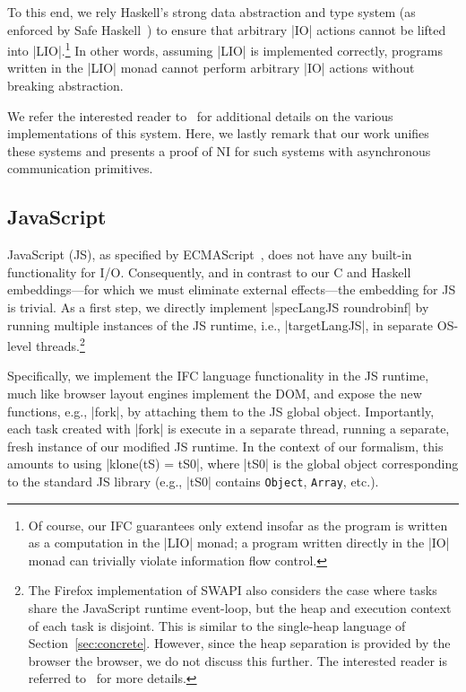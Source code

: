 To this end, we rely Haskell's strong data abstraction and type system
(as enforced by Safe Haskell~\cite{Terei:2012:SH:2364506.2364524}) to
ensure that arbitrary |IO| actions cannot be lifted into
|LIO|.\footnote{
Of course, our IFC guarantees only extend insofar as the program is
written as a computation in the |LIO| monad; a program written
directly in the |IO| monad can trivially violate information flow
control.
}
%
In other words, assuming |LIO| is implemented correctly, programs
written in the |LIO| monad cannot perform arbitrary |IO| actions
without breaking abstraction.
 
We refer the interested reader to~ for
additional details on the various implementations of this system.
%
Here, we lastly remark that our work unifies these systems and
presents a proof of NI for such systems with asynchronous
communication primitives.


\subsection{JavaScript}
\label{sec:real:js}

JavaScript (JS), as specified by ECMAScript~\tocite{}, does not have any
built-in functionality for I/O.
%
Consequently, and in contrast to our C and Haskell embeddings---for
which we must eliminate external effects---the embedding for JS is
trivial.
%
As a first step, we directly implement |specLangJS roundrobinf| by
running multiple instances of the JS runtime, i.e., |targetLangJS|, in
separate OS-level threads.\footnote{
 The Firefox implementation of SWAPI also considers the case where
 tasks share the JavaScript runtime event-loop, but the heap and
 execution context of each task is disjoint. This is similar to the
 single-heap language of Section~\ref{sec:concrete}.  However, since the heap
 separation is provided by the browser the browser, we do not discuss
 this further. The interested reader is referred to~\tocite{} for more
 details.
}

Specifically, we implement the IFC language functionality in the JS
runtime, much like browser layout engines implement the DOM, and
expose the new functions, e.g., |fork|, by attaching them to the JS
global object.
%
Importantly, each task created with |fork| is execute in a separate
thread, running a separate, fresh instance of our modified JS runtime.
%
In the context of our formalism, this amounts to using |klone(tS) =
tS0|, where |tS0| is the global object corresponding to the standard
JS library (e.g., |tS0| contains \texttt{Object}, \texttt{Array},
etc.).

